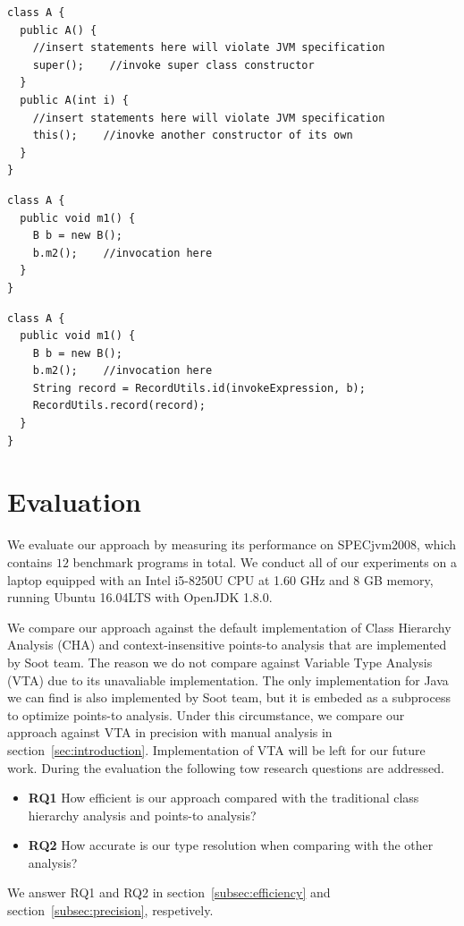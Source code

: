 \documentclass{fac}
\begin{document}
\begin{lstlisting}[caption={Java specification on constructor},label={lst:spec-constructor}]
class A {
  public A() {
    //insert statements here will violate JVM specification
    super();	//invoke super class constructor
  }
  public A(int i) {
    //insert statements here will violate JVM specification
    this();    //inovke another constructor of its own
  }
}
\end{lstlisting}

\begin{lstlisting}[caption={Example code before instrumentation},label={lst:before-instru}]
class A {
  public void m1() {
    B b = new B();
    b.m2();    //invocation here
  }
}
\end{lstlisting}

\begin{lstlisting}[caption={Example code after instrumentation},label={lst:after-instru}]
class A {
  public void m1() {
    B b = new B();
    b.m2();    //invocation here
    String record = RecordUtils.id(invokeExpression, b);
    RecordUtils.record(record);
  }
}
\end{lstlisting}

\section{Evaluation}\label{sec:evaluation}
We evaluate our approach by measuring its performance on SPECjvm2008, which contains $12$ benchmark programs in total. We conduct all of our experiments on a laptop equipped with an Intel i5-8250U CPU at 1.60 GHz and 8 GB memory, running Ubuntu 16.04LTS with OpenJDK 1.8.0.

We compare our approach against the default implementation of Class Hierarchy Analysis (CHA) and context-insensitive points-to analysis that are implemented by Soot team. The reason we do not compare against Variable Type Analysis (VTA) due to its unavaliable implementation. The only implementation for Java we can find is also implemented by Soot team, but it is embeded as a subprocess to optimize points-to analysis. Under this circumstance, we compare our approach against VTA in precision with manual analysis in section~\ref{sec:introduction}. Implementation of VTA will be left for our future work. During the evaluation the following tow research questions are addressed.
\begin{itemize}
\item \textbf{RQ1} How efficient is our approach compared with the traditional class hierarchy analysis and points-to analysis?
\item \textbf{RQ2} How accurate is our type resolution when comparing with the other analysis?
\end{itemize}
We answer RQ1 and RQ2 in section~\ref{subsec:efficiency} and section~\ref{subsec:precision}, respetively.
\end{document}
